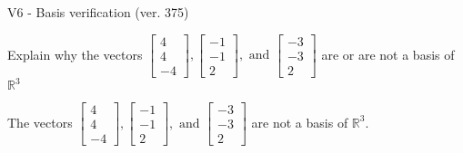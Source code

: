 \begin{exercise}
  \begin{exerciseTitle}V6 - Basis verification (ver. 375)\end{exerciseTitle}
  \begin{exerciseStatement}
    Explain why the vectors \(\left[\begin{array}{r}
4 \\
4 \\
-4
\end{array}\right] , \left[\begin{array}{r}
-1 \\
-1 \\
2
\end{array}\right] , \text{ and } \left[\begin{array}{r}
-3 \\
-3 \\
2
\end{array}\right]\) are or are not a basis of \(\mathbb{R}^3\)	


  \end{exerciseStatement}
  \begin{exerciseAnswer}
   The vectors \(\left[\begin{array}{r}
4 \\
4 \\
-4
\end{array}\right] , \left[\begin{array}{r}
-1 \\
-1 \\
2
\end{array}\right] , \text{ and } \left[\begin{array}{r}
-3 \\
-3 \\
2
\end{array}\right]\) 
  	 are not  a basis of \(\mathbb{R}^3\).
  


  \end{exerciseAnswer}
\end{exercise}